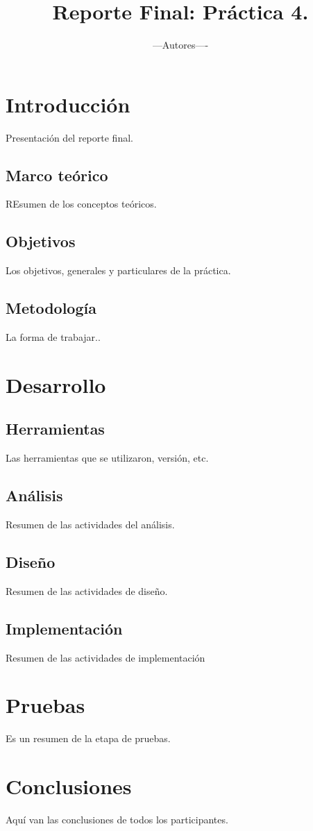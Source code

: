 \documentclass{book}
\title{Reporte Final: Práctica 4.}
\author{---Autores----}
\begin{document}
\maketitle

\chapter{Introducción}

Presentación del reporte final.

\section{Marco teórico}

REsumen de los conceptos teóricos.

\section{Objetivos}
Los objetivos, generales y particulares de la práctica.

\section{Metodología}

La forma de trabajar..

\chapter{Desarrollo}

\section{Herramientas}

Las herramientas que se utilizaron, versión, etc.

\section{Análisis}

Resumen de las actividades del análisis.

\section{Diseño}

Resumen de las actividades de diseño.

\section{Implementación}

Resumen de las actividades de implementación


\chapter{Pruebas}

Es un resumen de la etapa de pruebas.

\chapter{Conclusiones}

Aquí van las conclusiones de todos los participantes.
\end{document}
